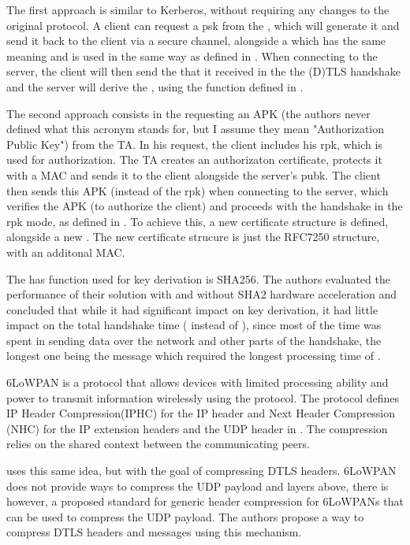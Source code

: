 \documentclass{llncs}
\begin{document}
The first approach is similar to Kerberos\cite{RFC4120}, without requiring any
changes to the original protocol. A client can request a \gls{psk}  from the ,
which will generate it and send it back to the client via a secure channel, alongside
a  which has the same meaning and is used in the same way
as defined in \cite{RFC4279}. When connecting to the server,
the client will then send the  that it received in the
the (D)TLS handshake and the server will derive the , using the
 function defined in \cite{RFC5246}.

The second approach consists in the   requesting an APK (the authors never defined
what this acronym stands for, but I assume they mean "Authorization Public Key")
from the TA. In his request,
the client includes his \gls{rpk}, which is used for authorization. The TA
creates an authorizaton certificate, protects it with a MAC and sends it
to the client alongside the server's \gls{pubk}.
The client then sends this APK (instead of the \gls{rpk})
when connecting to the server, which verifies the APK (to authorize the client)
and proceeds with the handshake in the \gls{rpk} mode, as defined in \cite{RFC4279}.
To achieve this, a new certificate structure is defined, alongside a new .
The new certificate strucure is just the RFC7250 \cite{RFC7250} structure, with an
additonal MAC.

The has function used for key derivation is SHA256. The authors evaluated the
performance of their solution with and without SHA2 hardware acceleration and
concluded that while it had significant impact on key derivation, it had little
impact on the total handshake time ( instead of ), since most of the time was spent in sending
data over the network and other parts of the handshake, the longest one being
the  message which required the longest processing time
of .

6LoWPAN\cite{RFC4944} is a protocol that allows devices with limited processing
ability and power to transmit information wirelessly using the 
protocol. The protocol defines IP Header Compression(IPHC) for the IP header and
Next Header Compression (NHC) for the IP extension headers and the UDP header in \cite{RFC6282}.
The compression relies on the shared context between the communicating peers.

\cite{6LoWPANC53:online} uses this same idea, but with the goal of compressing DTLS headers.
6LoWPAN does not provide ways to compress the UDP payload and layers above, there
is however, a proposed standard\cite{RFC7400} for generic header compression
for 6LoWPANs that can be used to compress the UDP payload. The authors propose
a way to compress DTLS headers and messages using this mechanism.
\end{document}
